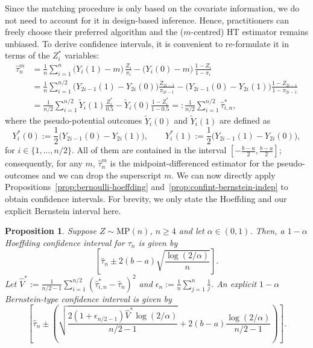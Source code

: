 \documentclass[aos]{imsart2}
\theoremstyle{plain}
\newtheorem{proposition}[theorem]{Proposition}
\theoremstyle{definition}
\newcommand{\yt}{\tilde{Y}}
\newcommand{\tauh}{\hat{\tau}}
\begin{document}
Since the matching procedure is only based on the covariate information, we do not need to account for it in design-based inference. Hence, practitioners can freely choose their preferred algorithm and the ($m$-centred) HT estimator remains unbiased. To derive confidence intervals, it is convenient to re-formulate it in terms of the $Z^*_i$ variables:
\begin{align*}
    \tauh^m_n &= \frac{1}{n} \sum_{i=1}^n \big(Y_i(1)-m\big)\, \frac{Z_i}{\pi_i}-\big(Y_i(0)-m\big)\, \frac{1-Z_i}{1-\pi_i}\\
    &= \frac{1}{n} \sum_{i=1}^{n/2} \big(Y_{2i-1}(1)-Y_{2i}(0)\big) \frac{Z_{2i-1}}{\pi_{2i-1}} - \big(Y_{2i-1}(0)-Y_{2i}(1)\big)\frac{1-Z_{2i-1}}{1-\pi_{2i-1}}\\
    &= \frac{1}{n/2} \sum_{i=1}^{n/2} \yt_i(1) \frac{Z^*_i}{0.5}-\yt_i(0)\frac{1-Z^*_{i}}{1-0.5} =: \frac{1}{n/2}\sum_{i=1}^{n/2} \tauh^*_{i,n},
\end{align*}
where the pseudo-potential outcomes $\yt_i(0)$ and $\yt_i(1)$ are defined as
\begin{equation*}
    Y^*_i(0) := \frac{1}{2} \big(Y_{2i-1}(0)-Y_{2i}(1)\big),\qquad
    Y^*_i(1) := \frac{1}{2}\big(Y_{2i-1}(1)-Y_{2i}(0)\big),
\end{equation*}
for $i \in\{1,\ldots,n/2\}$. All of them are contained in the interval $[-\frac{b-a}{2}, \frac{b-a}{2}]$; consequently, for any $m$, $\tauh^m_n$ is the midpoint-differenced estimator for the pseudo-outcomes and we can drop the superscript $m$. We can now directly apply Propositions~\ref{prop:bernoulli-hoeffding} and~\ref{prop:confint-bernstein-indep} to obtain confidence intervals. For brevity, we only state the Hoeffding and our explicit Bernstein interval here. 
\begin{proposition}
    Suppose $Z \sim \mathrm{MP}(n)$, $n\geq 4$ and let $\alpha \in (0,1)$. Then, a $1-\alpha$ Hoeffding confidence interval for $\tau_n$ is given by
    \begin{equation*}
        \left[\tauh_n \pm 2 (b-a)\sqrt{\frac{\log(2/\alpha)}{n}}\right].
    \end{equation*}
    Let $\hat{V}^*:= \frac{1}{n/2-1}\sum_{i=1}^{n/2} (\hat{\tau}^*_{i,n}-\tauh_n)^2$ and $\epsilon_n := \frac{1}{n} \sum_{j=1}^{n} \frac{1}{j}$. An explicit $1-\alpha$ Bernstein-type confidence interval is given by
    \begin{equation*}
        \left[\tauh_n \pm \left(\sqrt{\frac{2(1+\epsilon_{n/2-1})\hat{V}^*\log(2/\alpha)}{n/2-1}} + 2(b-a)\frac{\log(2/\alpha)}{n/2-1}\right)\right].
    \end{equation*}
\end{proposition}
\end{document}
